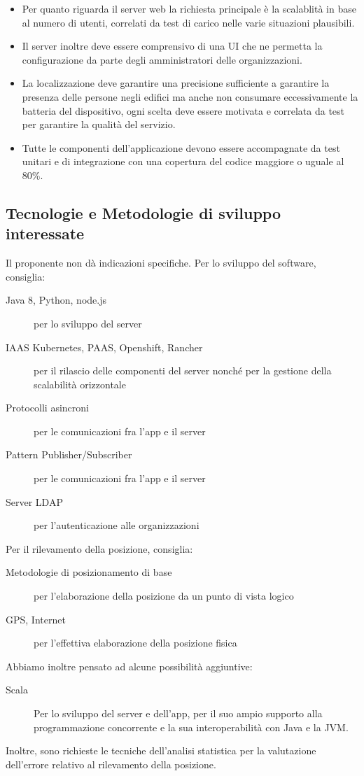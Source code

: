 \documentclass[../studio-di-fattibilita.tex]{subfiles}
\begin{document}
\begin{itemize}
		\item Per quanto riguarda il server web la richiesta principale è la scalablità in base al numero di utenti, correlati da test di carico nelle varie situazioni plausibili.
		\item	Il server inoltre deve essere comprensivo di una UI che ne permetta la configurazione da parte degli amministratori delle organizzazioni.
		\item La localizzazione deve garantire una precisione sufficiente a garantire la presenza delle persone negli edifici ma anche non consumare eccessivamente la batteria del dispositivo, ogni scelta deve essere motivata e correlata da test per garantire la qualità del servizio.
		\item Tutte le componenti dell’applicazione devono essere accompagnate da test unitari e di integrazione con una copertura del codice maggiore o uguale al 80\%. 
	\end{itemize}
	\subsection{Tecnologie e Metodologie di sviluppo interessate}
	\label{subsec:tecnologie_interessate}
	Il proponente non dà indicazioni specifiche. Per lo sviluppo del software, consiglia:
	\begin{description}
		\item[Java 8, Python, node.js] per lo sviluppo del server
		\item[IAAS Kubernetes, PAAS, Openshift, Rancher] per il rilascio delle componenti del server nonché per la gestione della scalabilità orizzontale
		\item[Protocolli asincroni] per le comunicazioni fra l'app e il server
		\item[Pattern Publisher/Subscriber] per le comunicazioni fra l'app e il server
		\item[Server LDAP] per l'autenticazione alle organizzazioni 
	\end{description}
	Per il rilevamento della posizione, consiglia:
	\begin{description}
		\item[Metodologie di posizionamento di base] per l'elaborazione della posizione da un punto di vista logico
		\item[GPS, Internet] per l'effettiva elaborazione della posizione fisica
	\end{description}
	Abbiamo inoltre pensato ad alcune possibilità aggiuntive:
	\begin{description}
		\item[Scala] Per lo sviluppo del server e dell'app, per il suo ampio supporto alla programmazione concorrente e la sua interoperabilità con Java e la JVM.
	\end{description}
	Inoltre, sono richieste le tecniche dell'analisi statistica per la valutazione dell'errore relativo al rilevamento della posizione.
\end{document}

